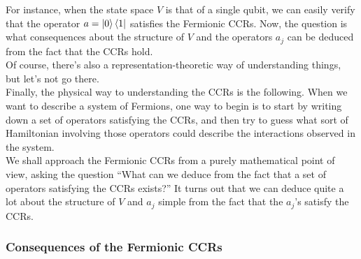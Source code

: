 \documentclass{book}
\theoremstyle{definition}
\begin{document}
For instance, when the state space $V$ is that of a single qubit, we can easily verify that the operator $a =\ket{0}\bra{1}$ satisfies the Fermionic CCRs. Now, the question is what consequences about the structure of $V$ and the operators $a_j$ can be deduced from the fact that the CCRs hold. \\

Of course, there's also a representation-theoretic way of understanding things, but let's not go there. \\

Finally, the physical way to understanding the CCRs is the following. When we want to describe a system of Fermions, one way to begin is to start by writing down a set of operators satisfying the CCRs, and then try to guess what sort of Hamiltonian involving those operators could describe the interactions observed in the system. \\

We shall approach the Fermionic CCRs from a purely mathematical point of view, asking the question ``What can we deduce from the fact that a set of operators satisfying the CCRs exists?'' It turns out that we can deduce quite a lot about the structure of $V$ and $a_j$ simple from the fact that the $a_j$'s satisfy the CCRs.


\subsubsection{Consequences of the Fermionic CCRs}
\end{document}
